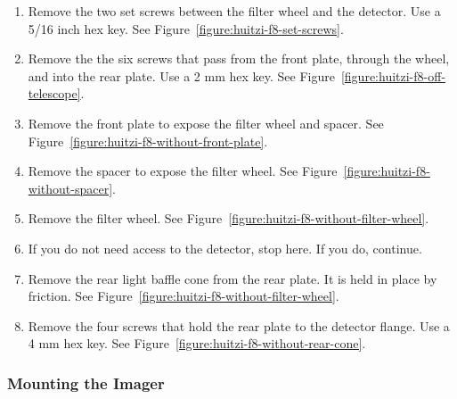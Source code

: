 \begin{enumerate}
    \item Remove the two set screws between the filter wheel and the detector. Use a 5/16 inch hex key. See Figure~\ref{figure:huitzi-f8-set-screws}.
    
    \item Remove the the six screws that pass from the front plate, through the wheel, and into the rear plate. Use a 2 mm hex key. See Figure~\ref{figure:huitzi-f8-off-telescope}.
    
    \item Remove the front plate to expose the filter wheel and spacer. See Figure~\ref{figure:huitzi-f8-without-front-plate}.
    
    \item Remove the spacer to expose the filter wheel. See Figure~\ref{figure:huitzi-f8-without-spacer}.
    
    \item Remove the filter wheel. See Figure~\ref{figure:huitzi-f8-without-filter-wheel}.
    
    \item If you do not need access to the detector, stop here. If you do, continue.
    
    \item Remove the rear light baffle cone from the rear plate. It is held in place by friction.  See Figure~\ref{figure:huitzi-f8-without-filter-wheel}. 
    
    \item Remove the four screws that hold the rear plate to the detector flange. Use a 4 mm hex key. See Figure~\ref{figure:huitzi-f8-without-rear-cone}.

\end{enumerate}

\subsubsection{Mounting the Imager}

